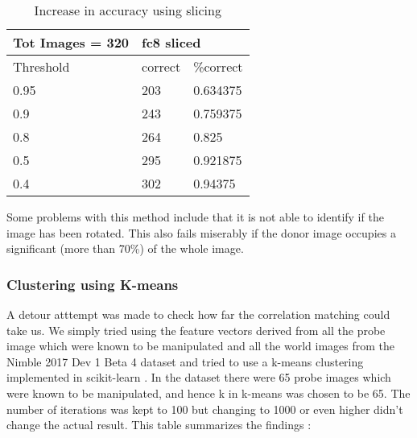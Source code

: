 \documentclass{article}
\begin{document}
\begin{table}[H]
\centering
\caption{Increase in accuracy using slicing}
\label{slicing}
\begin{tabular}{|l|l|l|}
  \hline
  Tot Images = 320 & \multicolumn{2}{|l|}{fc8 sliced} \\
  \hline
  Threshold        & correct       & \%correct      \\
  \hline
  0.95             & 203           & 0.634375       \\
  0.9              & 243           & 0.759375       \\
  0.8              & 264           & 0.825          \\
  0.5              & 295           & 0.921875       \\
  0.4              & 302           & 0.94375 \\
  \hline
\end{tabular}
\end{table}

Some problems with this method include that it is not able to identify if the image has been rotated. This also fails miserably if the donor image occupies a significant (more than 70\%) of the whole image.

\subsubsection{Clustering using K-means}
A detour atttempt was made to check how far the correlation matching could take us. We simply tried using the feature vectors derived from all the probe image which were known to be manipulated and all the world images from the Nimble 2017 Dev 1 Beta 4 dataset and tried to use a k-means clustering implemented in scikit-learn \cite{scikit-learn}. In the dataset there were 65 probe images which were known to be manipulated, and hence k in k-means was chosen to be 65. The number of iterations was kept to 100 but changing to 1000 or even higher didn't change the actual result. This table summarizes the findings :
\end{document}
